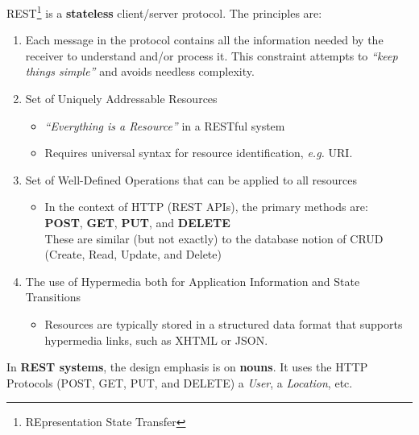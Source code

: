 REST\footnote{REpresentation State Transfer} is a {\bf stateless} client/server protocol. The principles are:
\begin{enumerate}
 \item Each message in the protocol contains all the information needed by the receiver to understand and/or process it. This constraint attempts to {\it ``keep things simple''} and avoids needless complexity.
 \item Set of Uniquely Addressable Resources
 \begin{itemize}
  \item {\it ``Everything is a Resource''} in a RESTful system
  \item Requires universal syntax for resource identification, {\it e.g.} URI.
 \end{itemize}
 \item Set of Well-Defined Operations that can be applied to all resources
 \begin{itemize}
  \item In the context of HTTP (REST APIs), the primary methods are: \\
  {\bf POST}, {\bf GET}, {\bf PUT}, and {\bf DELETE} \\
  These are similar (but not exactly) to the database notion of CRUD (Create, Read, Update, and Delete)
 \end{itemize}
 \item The use of Hypermedia both for Application Information and State Transitions
 \begin{itemize}
  \item Resources are typically stored in a structured data format that supports hypermedia links, such as XHTML or JSON.
 \end{itemize}
\end{enumerate}
In {\bf REST systems}, the design emphasis is on {\bf nouns}. It uses the HTTP Protocols (POST, GET, PUT, and DELETE) a {\it User}, a {\it Location}, etc. 

\clearpage




